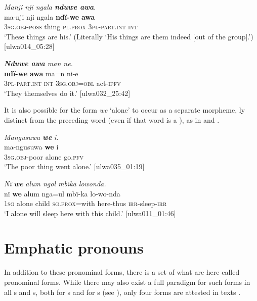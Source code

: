 \ea%
    \label{ex:pron:77}
          \textit{Manji nji ngala \textbf{nduwe awa}}.\\
\gll ma-nji      nji    ngala    \textbf{ndï{}-we}    \textbf{awa}\\
    3\textsc{sg.obj-poss}  thing  \textsc{pl.prox}  3\textsc{pl-part.int}  \textsc{int}\\
\glt `These things are his.’ (Literally ‘His things are them indeed [out of the group].’) [ulwa014\_05:28]
\z

\ea%
    \label{ex:pron:78}
          \textit{\textbf{Nduwe awa} man ne.}\\
\gll    \textbf{ndï{}-we}      \textbf{awa} ma=n      ni-e\\
    3\textsc{pl-part.int}  \textsc{int}    \textsc{3sg.obj=obl}  act-\textsc{ipfv}\\
\glt `They themselves do it.’ [ulwa032\_25:42]
\z

It is also possible for the form \textit{we} ‘alone’ to occur as a separate morpheme, ly distinct from the preceding word (even if that word is a ), as in  and .


\ea%
    \label{ex:pron:79}
          \textit{Mangusuwa} \textbf{\textit{we}} \textit{i.}\\
\gll ma-ngusuwa  \textbf{we}    i\\
    3\textsc{sg.obj{}-}poor  alone  go.\textsc{pfv}\\
\glt `The poor thing went alone.’ [ulwa035\_01:19]
\z

\ea%
    \label{ex:pron:80}
          \textit{Nï} \textbf{\textit{we}} \textit{alum ngol mbïka lowonda.}\\
\gll   nï    \textbf{we}    alum  nga=ul      mbï-ka    lo-wo-nda\\
    1\textsc{sg}  alone  child  \textsc{sg.prox}=with  here-thus  \textsc{irr}{}-sleep-\textsc{irr}\\
\glt `I alone will sleep here with this child.’ [ulwa011\_01:46]
\z

\section{Emphatic pronouns}\label{sec:6.7}


In addition to these  pronominal forms, there is a set of what are here called  pronominal forms. While there may also exist a full paradigm for such forms in all s and s, both for s and for s (see ), only four forms are attested in texts .


